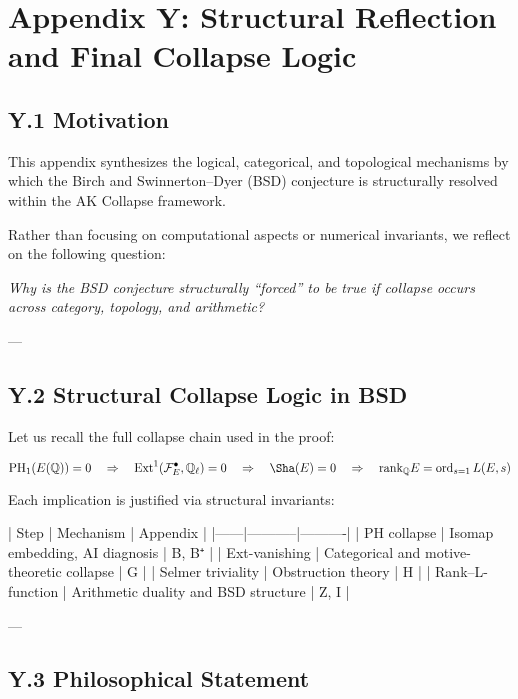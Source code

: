 \documentclass[11pt]{article}
\theoremstyle{definition}
\begin{document}
\section*{Appendix Y: Structural Reflection and Final Collapse Logic}

\subsection*{Y.1 Motivation}

This appendix synthesizes the logical, categorical, and topological mechanisms  
by which the Birch and Swinnerton–Dyer (BSD) conjecture is structurally resolved  
within the AK Collapse framework.

Rather than focusing on computational aspects or numerical invariants,  
we reflect on the following question:

\begin{center}
\textit{Why is the BSD conjecture structurally “forced” to be true  
if collapse occurs across category, topology, and arithmetic?}
\end{center}

---

\subsection*{Y.2 Structural Collapse Logic in BSD}

Let us recall the full collapse chain used in the proof:

\[
\mathrm{PH}_1(E(\mathbb{Q})) = 0
\quad \Rightarrow \quad
\mathrm{Ext}^1(\mathcal{F}_E^\bullet, \mathbb{Q}_\ell) = 0
\quad \Rightarrow \quad
\Sha(E) = 0
\quad \Rightarrow \quad
\mathrm{rank}_{\mathbb{Q}} E = \operatorname{ord}_{s=1} L(E, s)
\]

Each implication is justified via structural invariants:

| Step | Mechanism | Appendix |
|------|-----------|----------|
| PH collapse | Isomap embedding, AI diagnosis | B, B⁺ |
| Ext-vanishing | Categorical and motive-theoretic collapse | G |
| Selmer triviality | Obstruction theory | H |
| Rank–L-function | Arithmetic duality and BSD structure | Z, I |

---

\subsection*{Y.3 Philosophical Statement}
\end{document}
